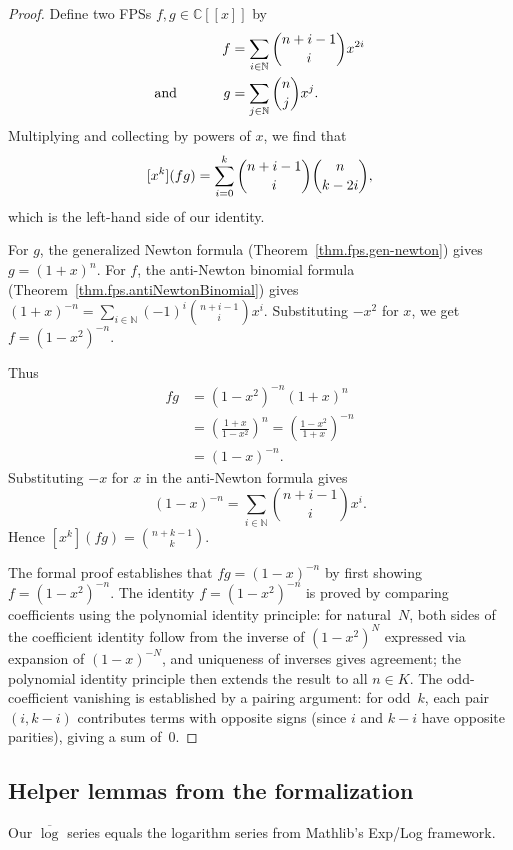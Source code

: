\begin{proof}
Define two FPSs $f,g\in\mathbb{C}\left[  \left[  x\right]  \right]  $ by
\begin{align*}
f  &  =\sum_{i\in\mathbb{N}}\dbinom{n+i-1}{i}x^{2i}\\
\text{and}\ \ \ \ \ \ \ \ \ \ g  &  =\sum_{j\in\mathbb{N}}\dbinom{n}{j}x^{j}.
\end{align*}
Multiplying and collecting by powers of $x$, we find that
\[
[x^k](fg) = \sum_{i=0}^{k} \dbinom{n+i-1}{i}\dbinom{n}{k-2i},
\]
which is the left-hand side of our identity.

For $g$, the generalized Newton formula (Theorem~\ref{thm.fps.gen-newton})
gives $g=(1+x)^n$.
For $f$, the anti-Newton binomial formula
(Theorem~\ref{thm.fps.antiNewtonBinomial}) gives $(1+x)^{-n} = \sum_{i\in\mathbb{N}}(-1)^i\binom{n+i-1}{i}x^i$.
Substituting $-x^2$ for $x$, we get $f = (1-x^2)^{-n}$.

Thus
\begin{align*}
fg &= (1-x^2)^{-n}(1+x)^n \\
&= \left(\frac{1+x}{1-x^2}\right)^n
= \left(\frac{1-x^2}{1+x}\right)^{-n} \\
&= (1-x)^{-n}.
\end{align*}
Substituting $-x$ for $x$ in the anti-Newton formula gives
\[
(1-x)^{-n} = \sum_{i\in\mathbb{N}}\binom{n+i-1}{i}x^i.
\]
Hence $[x^k](fg) = \binom{n+k-1}{k}$.

The formal proof establishes that $fg = (1-x)^{-n}$ by first showing $f = (1-x^2)^{-n}$.
The identity $f = (1-x^2)^{-n}$ is proved by comparing
coefficients using the polynomial identity principle:
for natural~$N$, both sides of the coefficient identity follow from
the inverse of $(1-x^2)^N$ expressed via expansion of $(1-x)^{-N}$, and uniqueness of inverses
gives agreement;
the polynomial identity principle then extends the result to all $n\in K$.
The odd-coefficient vanishing is established by a pairing argument: for odd~$k$,
each pair $(i,k-i)$ contributes terms with opposite signs (since $i$ and $k-i$ have
opposite parities), giving a sum of~$0$.
\end{proof}

\subsection{Helper lemmas from the formalization}

\begin{lemma}
\label{lem.fps.logSeries-eq-logbar}
\leanhelper
\leanok
Our $\overline{\log}$ series equals the logarithm series from
Mathlib's Exp/Log framework.
\end{lemma}

